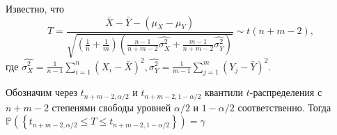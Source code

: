 \documentclass{article}
\begin{document}
Известно, что
\begin{equation*}
    T=\frac{\bar{X}-\bar{Y}-\left(\mu_{X}-\mu_{Y}\right)}{\sqrt{\left(\frac{1}{n}+\frac{1}{m}\right)\left(\frac{n-1}{n+m-2} \widehat{\sigma_{X}^{2}}+\frac{m-1}{n+m-2} \widehat{\sigma_{Y}^{2}}\right)}} \sim t(n+m-2),
\end{equation*}
где $\widehat{\sigma_{X}^{2}}=\frac{1}{n-1} \sum_{i=1}^{n}\left(X_{i}-\bar{X}\right)^{2}, \widehat{\sigma_{Y}^{2}}=\frac{1}{m-1} \sum_{j=1}^{m}\left(Y_{j}-\bar{Y}\right)^{2}$.


Обозначим через $t_{n+m-2, \alpha / 2}$ и $t_{n+m-2,1-\alpha / 2}$ квантили $t$-распределения с $n+m-2$ степенями свободы уровней $\alpha / 2$ и $1-\alpha / 2$ соответственно. Тогда $\mathbb{P}\left(\left\{t_{n+m-2, \alpha / 2} \leq T \leq t_{n+m-2,1-\alpha / 2}\right\}\right)=\gamma$
\end{document}
